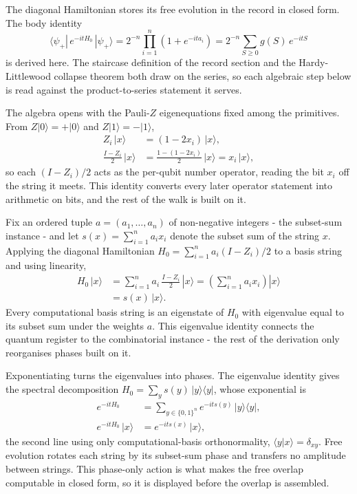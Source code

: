 The diagonal Hamiltonian stores its free evolution in the record in closed form. The body identity
\begin{equation*}
\langle \psi_+ | \, e^{-i t H_0} \, | \psi_+ \rangle
= 2^{-n} \prod_{i=1}^{n} \left( 1 + e^{-i t a_i} \right)
= 2^{-n} \sum_{S \ge 0} g(S) \, e^{-i t S}
\end{equation*}
is derived here. The staircase definition of the record section and the Hardy-Littlewood collapse theorem both draw on the series, so each algebraic step below is read against the product-to-series statement it serves.

The algebra opens with the Pauli-$Z$ eigenequations fixed among the primitives. From $Z|0\rangle = +|0\rangle$ and $Z|1\rangle = -|1\rangle$,
\begin{align*}
Z_i \, |x\rangle &= (1 - 2 x_i) \, |x\rangle , \\
\frac{I - Z_i}{2} \, |x\rangle &= \frac{1 - (1 - 2 x_i)}{2} \, |x\rangle = x_i \, |x\rangle ,
\end{align*}
so each $(I - Z_i)/2$ acts as the per-qubit number operator, reading the bit $x_i$ off the string it meets. This identity converts every later operator statement into arithmetic on bits, and the rest of the walk is built on it.

Fix an ordered tuple $a = (a_1, \dots, a_n)$ of non-negative integers - the subset-sum instance - and let $s(x) = \sum_{i=1}^{n} a_i x_i$ denote the subset sum of the string $x$. Applying the diagonal Hamiltonian $H_0 = \sum_{i=1}^{n} a_i (I - Z_i)/2$ to a basis string and using linearity,
\begin{align*}
H_0 \, |x\rangle &= \sum_{i=1}^{n} a_i \, \frac{I - Z_i}{2} \, |x\rangle
= \left( \sum_{i=1}^{n} a_i x_i \right) |x\rangle \\
&= s(x) \, |x\rangle .
\end{align*}
Every computational basis string is an eigenstate of $H_0$ with eigenvalue equal to its subset sum under the weights $a$. This eigenvalue identity connects the quantum register to the combinatorial instance - the rest of the derivation only reorganises phases built on it.

Exponentiating turns the eigenvalues into phases. The eigenvalue identity gives the spectral decomposition $H_0 = \sum_{y} s(y) \, |y\rangle\langle y|$, whose exponential is
\begin{align*}
e^{-i t H_0} &= \sum_{y \in \{0,1\}^n} e^{-i t s(y)} \, |y\rangle\langle y| , \\
e^{-i t H_0} \, |x\rangle &= e^{-i t s(x)} \, |x\rangle ,
\end{align*}
the second line using only computational-basis orthonormality, $\langle y | x \rangle = \delta_{xy}$. Free evolution rotates each string by its subset-sum phase and transfers no amplitude between strings. This phase-only action is what makes the free overlap computable in closed form, so it is displayed before the overlap is assembled.

